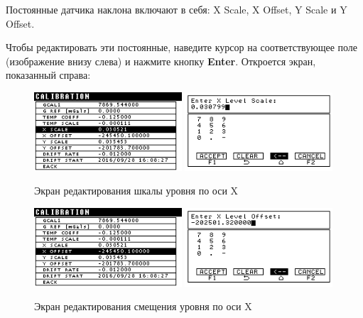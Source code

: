 Постоянные датчика наклона включают в себя: X Scale, X Offset, Y Scale и Y Offset.

Чтобы редактировать эти постоянные, наведите курсор на соответствующее поле
(изображение внизу слева) и нажмите кнопку \textbf{Enter}. Откроется экран,
показанный справа:

\newpage
\begin{figure}[H]
  \centering
  \includegraphics[width=0.49\textwidth]{figures/the_x_level_scale_editing_screen_1}
  \includegraphics[width=0.49\textwidth]{figures/the_x_level_scale_editing_screen_2}
  \caption{Экран редактирования шкалы уровня по оси X}
  \label{fig:the_x_level_scale_editing_screen}
\end{figure}

\begin{figure}[H]
  \centering
  \includegraphics[width=0.49\textwidth]{figures/the_x_level_offset_editing_screen_1}
  \includegraphics[width=0.49\textwidth]{figures/the_x_level_offset_editing_screen_2}
  \caption{Экран редактирования смещения уровня по оси X}
  \label{fig:the_x_level_offset_editing_screen}
\end{figure}


